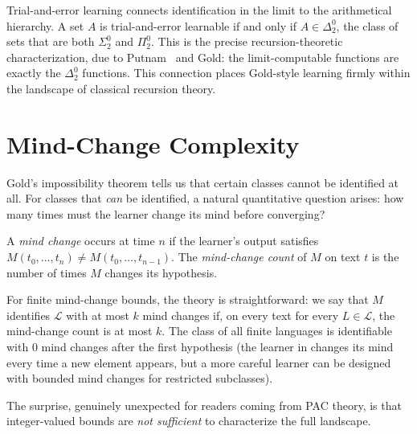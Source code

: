 Trial-and-error learning connects identification in the limit to the arithmetical hierarchy. A set $A$ is trial-and-error learnable if and only if $A \in \Delta^0_2$, the class of sets that are both $\Sigma^0_2$ and $\Pi^0_2$. This is the precise recursion-theoretic characterization, due to Putnam~\cite{Gold1965} and Gold: the limit-computable functions are exactly the $\Delta^0_2$ functions. This connection places Gold-style learning firmly within the landscape of classical recursion theory.


\section{Mind-Change Complexity}
\label{sec:mind-change}

Gold's impossibility theorem tells us that certain classes cannot be identified at all. For classes that \emph{can} be identified, a natural quantitative question arises: how many times must the learner change its mind before converging?

\begin{defn}
\label{def:mind-change}
  \leanok
A \emph{mind change} occurs at time $n$ if the learner's output satisfies $M(t_0, \ldots, t_n) \neq M(t_0, \ldots, t_{n-1})$. The \emph{mind-change count} of $M$ on text $t$ is the number of times $M$ changes its hypothesis.
\end{defn}

For finite mind-change bounds, the theory is straightforward: we say that $M$ identifies $\mathcal{L}$ with at most $k$ mind changes if, on every text for every $L \in \mathcal{L}$, the mind-change count is at most $k$. The class of all finite languages is identifiable with 0 mind changes after the first hypothesis (the learner in  changes its mind every time a new element appears, but a more careful learner can be designed with bounded mind changes for restricted subclasses).

The surprise, genuinely unexpected for readers coming from PAC theory, is that integer-valued bounds are \emph{not sufficient} to characterize the full landscape.

